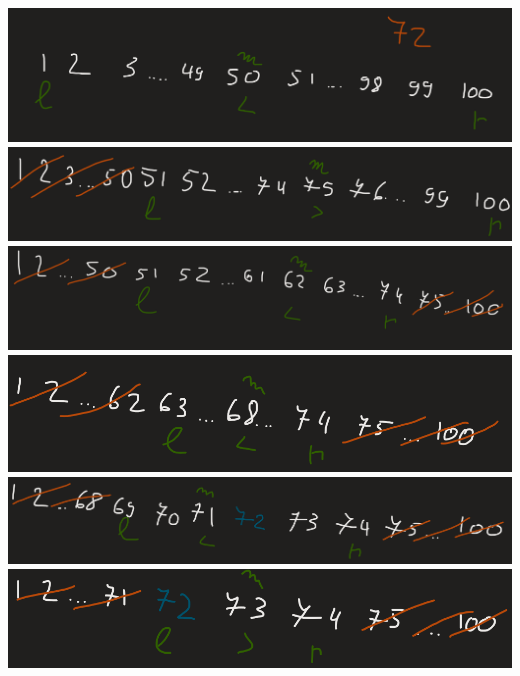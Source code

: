 \begin{center}
\includegraphics[width=\textwidth]{images/cautari/cb1.png}
\includegraphics[width=\textwidth]{images/cautari/cb2.png}
\includegraphics[width=\textwidth]{images/cautari/cb3.png}
\includegraphics[width=\textwidth]{images/cautari/cb4.png}
\includegraphics[width=\textwidth]{images/cautari/cb5.png}
\includegraphics[width=\textwidth]{images/cautari/cb6.png}

\end{center}
